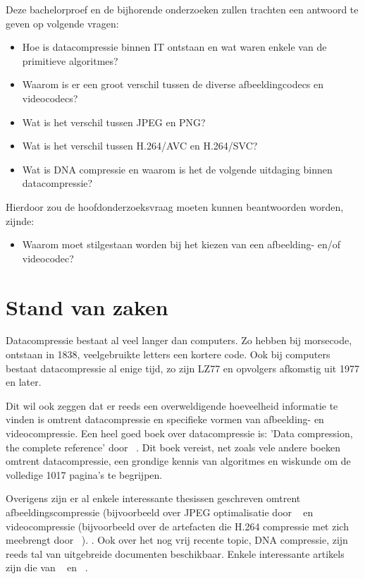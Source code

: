 Deze bachelorproef en de bijhorende onderzoeken zullen trachten een antwoord te geven op volgende vragen: 
\begin{itemize}
    \item{Hoe is datacompressie binnen IT ontstaan en wat waren enkele van de primitieve algoritmes?}
     \item{Waarom is er een groot verschil tussen de diverse afbeeldingcodecs en videocodecs?}
     \item{Wat is het verschil tussen JPEG en PNG?}
      \item{Wat is het verschil tussen H.264/AVC en H.264/SVC?}
      \item{Wat is DNA compressie en waarom is het de volgende uitdaging binnen datacompressie?}
\end{itemize}
Hierdoor zou de hoofdonderzoeksvraag moeten kunnen beantwoorden worden, zijnde:  
\begin{itemize}
    \item{Waarom moet stilgestaan worden bij het kiezen van een afbeelding- en/of videocodec?}
\end{itemize}

\section{Stand van zaken}
\label{sec:stand-van-zaken}

Datacompressie bestaat al veel langer dan computers. Zo hebben bij morsecode, ontstaan in 1838, veelgebruikte letters een kortere code. Ook bij computers bestaat datacompressie al enige tijd, zo zijn LZ77 en opvolgers afkomstig uit 1977 en later. \autocite{Riha2011} 

Dit wil ook zeggen dat er reeds een overweldigende hoeveelheid informatie te vinden is omtrent datacompressie en specifieke vormen van afbeelding- en videocompressie. Een heel goed boek over datacompressie is: 'Data compression, the complete reference' door  ~\textcite{Salomon2006}. Dit boek vereist, net zoals vele andere boeken omtrent datacompressie,  een grondige kennis van algoritmes en wiskunde om de volledige 1017 pagina's te begrijpen.

Overigens zijn er al enkele interessante thesissen geschreven omtrent afbeeldingscompressie (bijvoorbeeld over JPEG optimalisatie door ~\textcite{Wahlstrom2015} en videocompressie (bijvoorbeeld over de artefacten die H.264 compressie met zich meebrengt door  ~\textcite{Rakesh2013}). . Ook over het nog vrij recente topic, DNA compressie, zijn reeds tal van uitgebreide documenten beschikbaar. Enkele interessante artikels zijn die van ~\textcite{Afify2011} en ~\textcite{Kuruppu2012}. 


